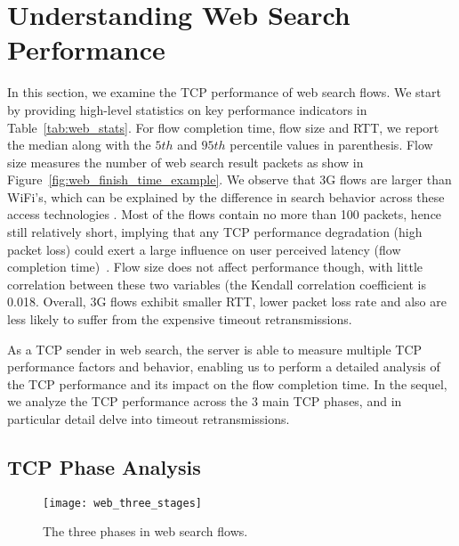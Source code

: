 
\section{Understanding Web Search Performance}
\label{sec:web_search}

In this section, we examine the TCP performance of web search flows. We start by providing high-level statistics on key performance indicators in Table~\ref{tab:web_stats}. For flow completion time, flow size and RTT, we report the median along with the $5th$ and $95th$ percentile values in parenthesis. Flow size measures the number of web search result packets as show in Figure~\ref{fig:web_finish_time_example}. We observe that 3G flows are larger than WiFi's, which can be explained by the difference in search behavior across these access technologies \cite{Song:2013:EEU:2488388.2488493}. Most of the flows contain no more than 100 packets, hence still relatively short, implying that any TCP performance degradation (\eg high packet loss) could exert a large influence on user perceived latency (\ie flow completion time)~\cite{flach2013reducing}. Flow size does not affect performance though, with little correlation between these two variables (the Kendall correlation coefficient is 0.018. Overall, 3G flows exhibit smaller RTT, lower packet loss rate and also are less likely to suffer from the expensive timeout retransmissions.

As a TCP sender in web search, the server is able to measure multiple TCP performance factors and behavior, enabling us to perform a detailed analysis of the TCP performance and its impact on the flow completion time. In the sequel, we analyze the TCP performance across the 3 main TCP phases, and in particular detail delve into timeout retransmissions.

\subsection{TCP Phase Analysis}

\begin{figure}[th]
\centering
\texttt{[image: web\_three\_stages]}
\caption{The three phases in web search flows.}
\label{fig:web_three_stages}
\minsqueeze
\end{figure}

